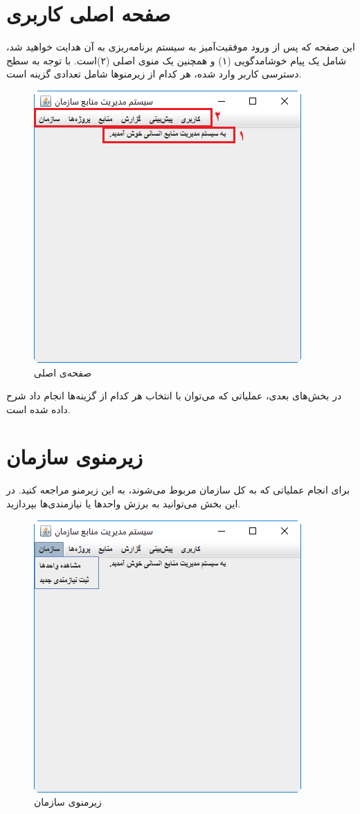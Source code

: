 \newpage
\section{صفحه اصلی کاربری}
این صفحه که پس از ورود موفقیت‌آمیز به سیستم برنامه‌ریزی به آن هدایت خواهید شد، شامل یک پیام خوشامدگویی  (۱) و  همچنین یک منوی اصلی  (۲)است. با توجه به سطح دسترسی کاربر وارد شده، هر کدام از زیرمنوها شامل تعدادی گزینه است.

	\begin{figure}[H]
		\centering
		\includegraphics[scale=0.7]{img/manual/main}
		\caption{صفحه‌ی اصلی}
	\end{figure}

در بخش‌های بعدی، عملیاتی که می‌توان با انتخاب هر کدام از گزینه‌ها انجام داد شرح داده شده است.

\newpage
\section{زیرمنوی سازمان}
برای انجام عملیاتی که به کل سازمان مربوط می‌شوند، به این زیرمنو مراجعه کنید. در این بخش می‌توانید به برزش واحدها یا نیازمندی‌ها بپردازید.
	\begin{figure}[H]
		\centering
		\includegraphics[scale=0.7]{img/manual/orgSubmenu}
		\caption{زیرمنوی سازمان}
	\end{figure}

